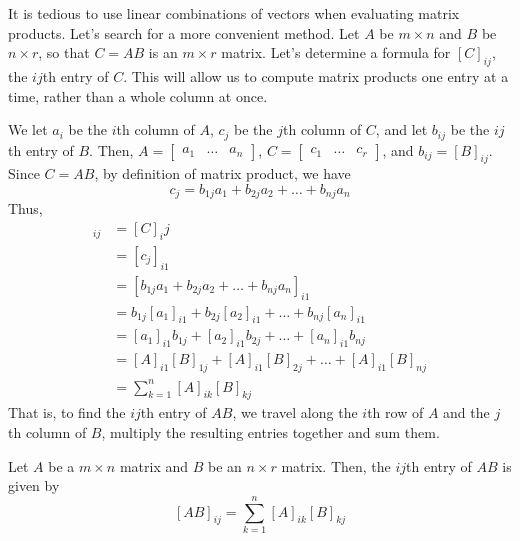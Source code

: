 \documentclass{article}
\begin{document}
\begin{remark}
  It is tedious to use linear combinations of vectors when evaluating matrix products. Let's search for a more convenient method. Let $A$ be $m \times n$ and $B$ be $n \times r$, so that $C = AB$ is an $m \times r$ matrix. Let's determine a formula for $[C]_{ij}$, the $ij$th entry of $C$.
  This will allow us to compute matrix products one entry at a time, rather than a whole column at once.

  We let $a_i$ be the $i$th column of $A$, $c_j$ be the $j$th column of $C$, and let $b_{ij}$ be the $ij$th entry of $B$. Then, $A =
  \begin{bmatrix}
    a_1 & \dots & a_n
  \end{bmatrix}$, $C =
  \begin{bmatrix}
    c_1 & \dots & c_r
  \end{bmatrix}$, and $b_{ij} = [B]_{ij}$. Since $C = AB$, by definition of matrix product, we have
  \[c_j = b_{1j}a_1 + b_{2j}a_2 + \dots + b_{nj}a_n\]
  Thus,
  \begin{align*}
    [AB]_{ij} &= [C]_ij\\
    &= [c_j]_{i1}\\
    &= [b_{1j}a_1 + b_{2j}a_2 + \dots + b_{nj}a_n]_{i1}\\
    &= b_{1j}[a_1]_{i1} + b_{2j}[a_2]_{i1} + \dots + b_{nj}[a_n]_{i1}\\
    &= [a_1]_{i1}b_{1j} + [a_2]_{i1}b_{2j} + \dots + [a_n]_{i1}b_{nj}\\
    &= [A]_{i1}[B]_{1j} + [A]_{i1}[B]_{2j} + \dots + [A]_{i1}[B]_{nj}\\
    &= \sum_{k=1}^n [A]_{ik}[B]_{kj}
  \end{align*}
  That is, to find the $ij$th entry of $AB$, we travel along the $i$th row of $A$ and the $j$th column of $B$, multiply the resulting entries together and sum them.
\end{remark}
\begin{theorem}
  Let $A$ be a $m \times n$ matrix and $B$ be an $n \times r$ matrix. Then, the $ij$th entry of $AB$ is given by
  \[[AB]_{ij} = \sum_{k=1}^n [A]_{ik}[B]_{kj}\]
\end{theorem}
\end{document}
